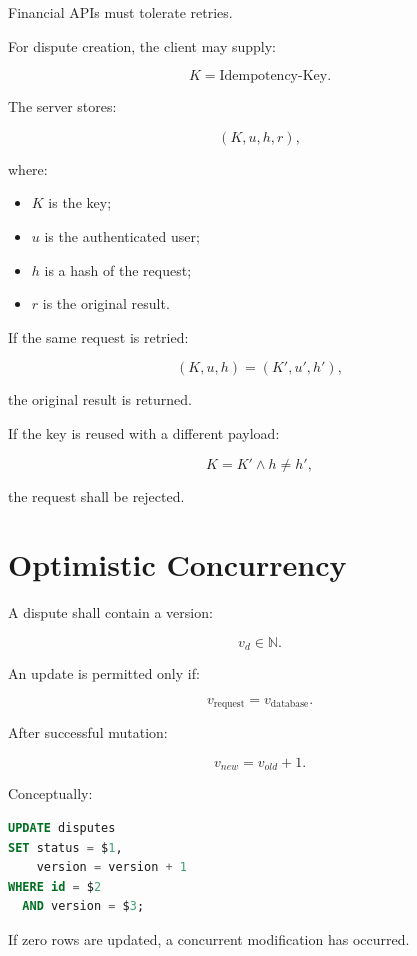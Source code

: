 \documentclass[11pt,a4paper]{article}
\begin{document}
Financial APIs must tolerate retries.

For dispute creation, the client may supply:

\[
K = \text{Idempotency-Key}.
\]

The server stores:

\[
(K,u,h,r),
\]

where:

\begin{itemize}
    \item \(K\) is the key;
    \item \(u\) is the authenticated user;
    \item \(h\) is a hash of the request;
    \item \(r\) is the original result.
\end{itemize}

If the same request is retried:

\[
(K,u,h)=(K',u',h'),
\]

the original result is returned.

If the key is reused with a different payload:

\[
K=K'
\land
h\neq h',
\]

the request shall be rejected.

\section{Optimistic Concurrency}

A dispute shall contain a version:

\[
v_d \in \mathbb{N}.
\]

An update is permitted only if:

\[
v_{\text{request}}
=
v_{\text{database}}.
\]

After successful mutation:

\[
v_{new}=v_{old}+1.
\]

Conceptually:

\begin{lstlisting}[language=SQL]
UPDATE disputes
SET status = $1,
    version = version + 1
WHERE id = $2
  AND version = $3;
\end{lstlisting}

If zero rows are updated, a concurrent modification has occurred.

\end{document}
